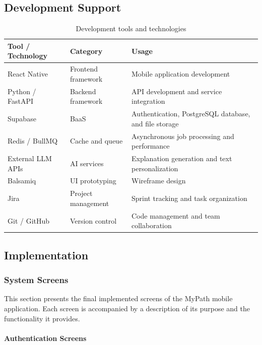 \documentclass[12pt,a4paper]{article}
\begin{document}
\subsection{Development Support}

\begin{table}[H]
\centering\small
\begin{tabular}{|p{3.5cm}|p{3.8cm}|p{6.2cm}|}
\hline
\textbf{Tool / Technology} & \textbf{Category} & \textbf{Usage} \\
\hline
React Native       & Frontend framework   & Mobile application development \\
Python / FastAPI   & Backend framework    & API development and service integration \\
Supabase           & BaaS                 & Authentication, PostgreSQL database, and file storage \\
Redis / BullMQ     & Cache and queue      & Asynchronous job processing and performance \\
External LLM APIs  & AI services          & Explanation generation and text personalization \\
Balsamiq           & UI prototyping       & Wireframe design \\
Jira               & Project management   & Sprint tracking and task organization \\
Git / GitHub       & Version control      & Code management and team collaboration \\
\hline
\end{tabular}
\caption{Development tools and technologies}
\end{table}

\subsection{Implementation}

\subsubsection{System Screens}

This section presents the final implemented screens of the MyPath mobile application. Each screen is accompanied by a description of its purpose and the functionality it provides.

\paragraph{Authentication Screens}
\end{document}
